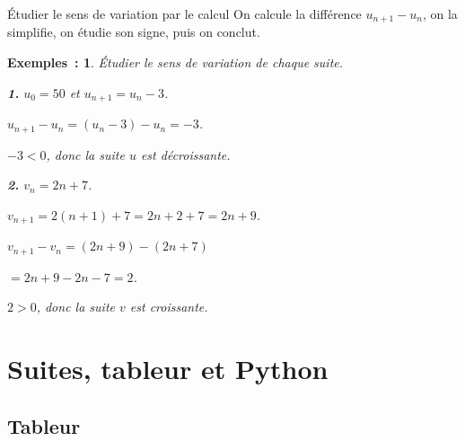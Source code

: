 \documentclass[12pt]{article}
\theoremstyle{break}
\newtheorem*{examples}{Exemples~:}
\theoremstyle{inline}
\begin{document}
\begin{method}{Étudier le sens de variation par le calcul}{}
  On calcule la différence $u_{n+1} - u_n$, on la simplifie, on étudie son signe, puis on conclut.
\end{method}

\begin{examples}
  Étudier le sens de variation de chaque suite.

  \medskip
  \begin{minipage}[t]{0.42\linewidth}
    \textbf{1.} $u_0 = 50$ et $u_{n+1} = u_n - 3$.
    \begin{multihideW}[1em]
      $u_{n+1} - u_n = (u_n - 3) - u_n = -3$.

      $-3 < 0$, donc la suite $u$ est décroissante.
    \end{multihideW}
  \end{minipage}
  \hfill
  \begin{minipage}[t]{0.55\linewidth}
    \textbf{2.} $v_n = 2n + 7$.
    \begin{multihideW}[1em]
      $v_{n+1} = 2(n + 1) + 7 = 2n + 2 + 7 = 2n + 9$.

      $v_{n+1} - v_n = (2n + 9) - (2n + 7)$

      \hspace{4.4em}$= 2n + 9 - 2n - 7 = 2$.

      $2 > 0$, donc la suite $v$ est croissante.
    \end{multihideW}
  \end{minipage}
\end{examples}

\newpage
\section{Suites, tableur et Python}

\subsection{Tableur}
\end{document}
